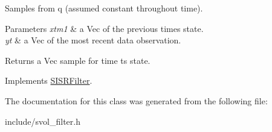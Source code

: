 Samples from q (assumed constant throughout time). 


\begin{DoxyParams}{Parameters}
{\em xtm1} & a Vec of the previous time\textquotesingle{}s state. \\
\hline
{\em yt} & a Vec of the most recent data observation. \\
\hline
\end{DoxyParams}
\begin{DoxyReturn}{Returns}
a Vec sample for time t\textquotesingle{}s state. 
\end{DoxyReturn}


Implements \hyperlink{classSISRFilter_a2c480a10cac8b52a36ab1309cf9ea1a4}{S\+I\+S\+R\+Filter}.



The documentation for this class was generated from the following file\+:\begin{DoxyCompactItemize}
\item 
include/svol\+\_\+filter.\+h\end{DoxyCompactItemize}
